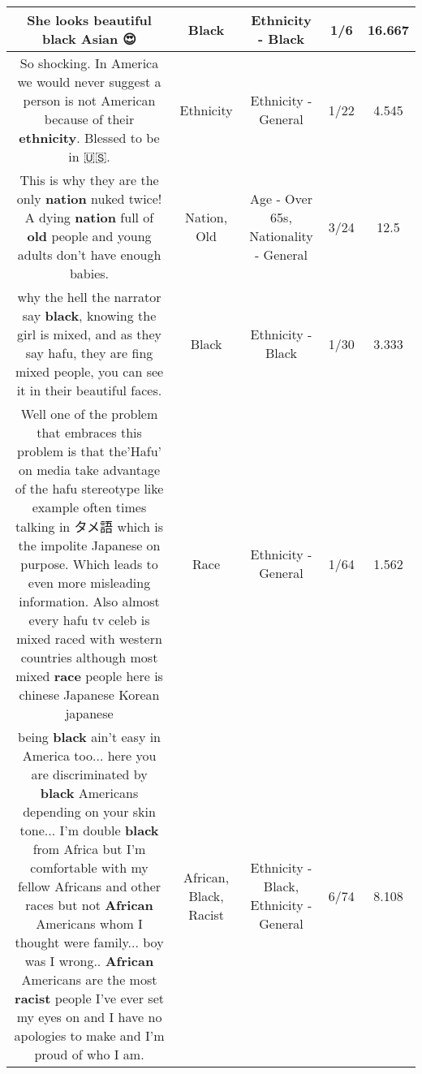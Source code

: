 \documentclass[11pt]{article}
\newlength\mylength
\begin{document}
\begin{center}
\begin{longtable}{|C{.65\mylength}|C{.30\mylength}|C{.12\mylength}|C{.12\mylength}|C{.12\mylength}|}
  \small She looks beautiful \textbf{black} Asian 😍\normalsize   & Black & Ethnicity - Black & 1/6 & 16.667 \\  \hline
  \small So shocking. In America we would never suggest a person is not American because of their \textbf{ethnicity}. Blessed to be in 🇺🇸.\normalsize   & Ethnicity & Ethnicity - General & 1/22 & 4.545 \\  \hline
  \small This is why they are the only \textbf{nation} nuked twice! A dying \textbf{nation} full of \textbf{old} people and young adults don't have enough babies.\normalsize   & Nation, Old & Age - Over 65s, Nationality - General & 3/24 & 12.5 \\  \hline
  \small why   the hell the narrator say \textbf{black}, knowing the girl is mixed, and as they say hafu, they are fing mixed people, you can see it in their beautiful faces.\normalsize   & Black & Ethnicity - Black & 1/30 & 3.333 \\  \hline
  \small Well one of the problem that embraces this problem is that the'Hafu' on media take advantage of the hafu stereotype like example often times talking in タメ語 which is the impolite Japanese on purpose.  Which leads to even more misleading information. Also almost every hafu tv celeb is mixed raced with western countries although most mixed \textbf{race} people here is chinese Japanese Korean japanese\normalsize   & Race & Ethnicity - General & 1/64 & 1.562 \\  \hline
  \small being \textbf{black} ain't easy in America too... here you are discriminated by \textbf{black} Americans depending on your skin tone... I'm double \textbf{black} from Africa but I'm comfortable with my fellow Africans and other races but not \textbf{African} Americans whom I thought were family... boy was I wrong.. \textbf{African} Americans are the most \textbf{racist} people I've ever set my eyes on  and I have no apologies to make and I'm proud of who I am.\normalsize   & African, Black, Racist & Ethnicity - Black, Ethnicity - General & 6/74 & 8.108 \\  \hline

\end{longtable}
\end{center}
\end{document}
